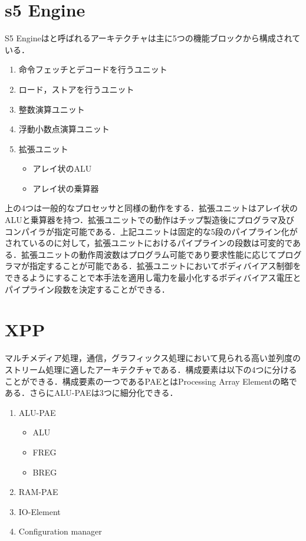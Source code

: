 {\section{s5 Engine}
\label{sec:s5}
S5 Engineはと呼ばれるアーキテクチャは主に5つの機能ブロックから構成されている．
\begin{enumerate}
\item 命令フェッチとデコードを行うユニット
\item ロード，ストアを行うユニット
\item 整数演算ユニット
\item 浮動小数点演算ユニット
\item 拡張ユニット
	\begin{itemize}
	\item アレイ状のALU
	\item アレイ状の乗算器
	\end{itemize}
\end{enumerate}

上の4つは一般的なプロセッサと同様の動作をする．拡張ユニットはアレイ状のALUと乗算器を持つ．拡張ユニットでの動作はチップ製造後にプログラマ及びコンパイラが指定可能である．上記ユニットは固定的な5段のパイプライン化がされているのに対して，拡張ユニットにおけるパイプラインの段数は可変的である．拡張ユニットの動作周波数はプログラム可能であり要求性能に応じてプログラマが指定することが可能である．拡張ユニットにおいてボディバイアス制御をできるようにすることで本手法を適用し電力を最小化するボディバイアス電圧とパイプライン段数を決定することができる．

\section{XPP}
\label{sec:XPP}
マルチメディア処理，通信，グラフィックス処理において見られる高い並列度のストリーム処理に適したアーキテクチャである．構成要素は以下の4つに分けることができる．構成要素の一つであるPAEとはProcessing Array Elementの略である．さらにALU-PAEは3つに細分化できる．
\begin{enumerate}
\item ALU-PAE
	\begin{itemize}
	\item ALU
	\item FREG
	\item BREG
	\end{itemize}
\item RAM-PAE
\item IO-Element
\item Configuration manager
\end{enumerate}

}
